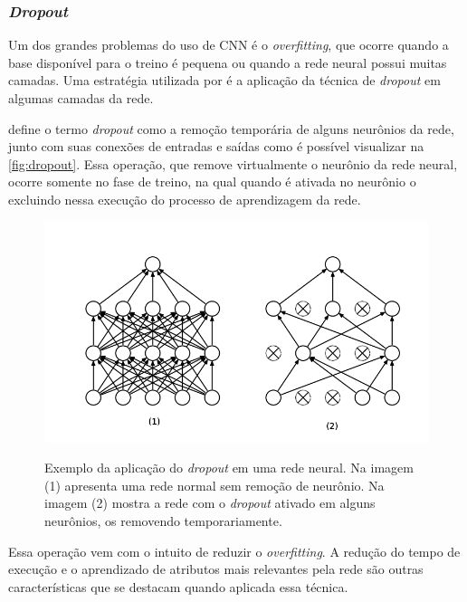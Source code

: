 \subsubsection{\textit{Dropout}}
Um dos grandes problemas do uso de CNN é o \textit{overfitting}, que ocorre quando a base disponível para o treino é pequena ou quando a rede neural possui muitas camadas. Uma estratégia utilizada por  é a aplicação da técnica de \textit{dropout} em algumas camadas da rede.
\par {} define o termo \textit{dropout} como a remoção temporária de alguns neurônios da rede, junto com suas conexões de entradas e saídas como é possível visualizar na \autoref{fig:dropout}. Essa operação, que remove virtualmente o neurônio da rede neural, ocorre somente no fase de treino, na qual quando é ativada no neurônio o excluindo nessa execução do processo de aprendizagem da rede.
\begin{figure}[H]
  \centering
  \caption{Exemplo da aplicação do \textit{dropout} em uma rede neural. Na imagem (1) apresenta uma rede normal sem remoção de neurônio. Na imagem (2) mostra a rede com o \textit{dropout} ativado em alguns neurônios, os removendo temporariamente.}
  \includegraphics[width=400pt]{dados/figuras/dropout}
  \label{fig:pooling}
\end{figure} 
\par Essa operação vem com o intuito de reduzir o \textit{overfitting}. A redução do tempo de execução e  o aprendizado de atributos mais relevantes pela rede são outras características que se destacam quando aplicada essa técnica.


